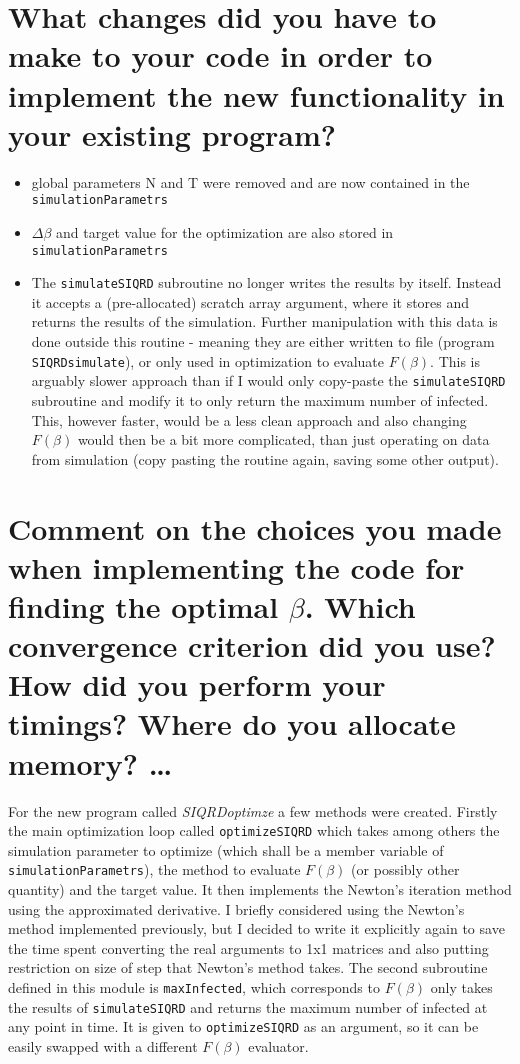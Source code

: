 \documentclass[a4paper]{article}
\begin{document}
\section{What changes did you have to make to your code in order to implement the new functionality in your existing program?}
\begin{itemize}
	\item global parameters N and T were removed and are now contained in the \texttt{simulationParametrs}
	\item $ \Delta\beta $ and target value for the optimization are also stored in \texttt{simulationParametrs}
	\item The \texttt{simulateSIQRD} subroutine no longer writes the results by itself. Instead it accepts a (pre-allocated) scratch array argument, where it stores and returns the results of the simulation. Further manipulation with this data is done outside this routine - meaning they are either written to file (program \texttt{SIQRDsimulate}), or only used in optimization to evaluate $ F(\beta) $. This is arguably slower approach than if I would only copy-paste the \texttt{simulateSIQRD} subroutine and modify it to only return the maximum number of infected. This, however faster, would be a less clean approach and also changing $ F(\beta) $ would then be a bit more complicated, than just operating on data from simulation (copy pasting the routine again, saving some other output).
\end{itemize}

\section{Comment on the choices you made when implementing the code for finding the optimal $\beta$. Which convergence criterion did you use? How did you perform your timings? Where do you allocate memory? \dots}
For the new program called \textit{SIQRDoptimze} a few methods were created. Firstly the main optimization loop called \texttt{optimizeSIQRD} which takes among others the simulation parameter to optimize (which shall be a member variable of \texttt{simulationParametrs}), the method to evaluate $ F(\beta) $ (or possibly other quantity) and the target value. It then implements the Newton's iteration method using the approximated derivative. I briefly considered using the Newton's method implemented previously, but I decided to write it explicitly again to save the time spent converting the real arguments to 1x1 matrices and also putting restriction on size of step that Newton's method takes. The second subroutine defined in this module is \texttt{maxInfected}, which corresponds to $ F(\beta) $ only takes the results of \texttt{simulateSIQRD} and returns the maximum number of infected at any point in time. It is given to \texttt{optimizeSIQRD} as an argument, so it can be easily swapped with a different $ F(\beta) $ evaluator.
\end{document}
